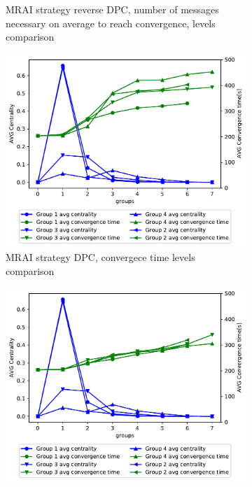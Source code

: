 \begin{figure}[h]
\begin{subfigure}[b]{0.45\textwidth}
		 \caption{\ac{MRAI} strategy reverse \ac{DPC}, number of messages necessary on
			average to reach convergence, levels comparison}
         \label{fig:different_levels_comparison_reverse_dpc_msg}
     \end{subfigure}
     \begin{subfigure}[b]{0.45\textwidth}
         \centering
         \includegraphics[width=\textwidth]{images/hierarchy/dpc_all_levels_comparison_centVStime.pdf}
		 \caption{\ac{MRAI} strategy \ac{DPC}, convergece time levels comparison}
         \label{fig:different_levels_comparison_dpc_time}
     \end{subfigure}
     \begin{subfigure}[b]{0.45\textwidth}
         \centering
         \includegraphics[width=\textwidth]{images/hierarchy/reverse_dpc_all_levels_comparison_centVStime.pdf}

\end{subfigure}
\end{figure}
